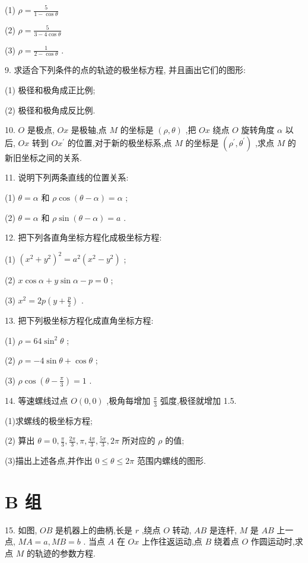 \documentclass[lang=cn,newtx,10pt,scheme=chinese]{elegantbook}
\begin{document}
(1) \(\rho = \frac{5}{1 - \cos \theta }\)

(2) \(\rho = \frac{5}{3 - 4\cos \theta }\)

(3) \(\rho = \frac{1}{2 - \cos \theta }\) .

9. 求适合下列条件的点的轨迹的极坐标方程, 并且画出它们的图形:

(1) 极径和极角成正比例;

(2) 极径和极角成反比例.

10. \(O\) 是极点, \({Ox}\) 是极轴,点 \(M\) 的坐标是 \(\left( {\rho ,\theta }\right)\) ,把 \({Ox}\) 绕点 \(O\) 旋转角度 \(\alpha\) 以后, \({Ox}\) 转到 \(O{x}^{\prime }\) 的位置,对于新的极坐标系,点 \(M\) 的坐标是 \(\left( {{\rho }^{\prime },{\theta }^{\prime }}\right)\) ,求点 \(M\) 的新旧坐标之间的关系.

11. 说明下列两条直线的位置关系:

(1) \(\theta = \alpha\) 和 \(\rho \cos \left( {\theta - \alpha }\right) = \alpha\) ;

(2) \(\theta = \alpha\) 和 \(\rho \sin \left( {\theta - \alpha }\right) = a\) .

12. 把下列各直角坐标方程化成极坐标方程:

(1) \({\left( {x}^{2} + {y}^{2}\right) }^{2} = {a}^{2}\left( {{x}^{2} - {y}^{2}}\right)\) ;

(2) \(x\cos \alpha + y\sin \alpha - p = 0\) ;

(3) \({x}^{2} = {2p}\left( {y + \frac{p}{2}}\right)\) .

13. 把下列极坐标方程化成直角坐标方程:

(1) \(\rho = {64}{\sin }^{2}\theta\) ;

(2) \(\rho = - 4\sin \theta + \cos \theta\) ;

(3) \(\rho \cos \left( {\theta - \frac{\pi }{3}}\right) = 1\) .

14. 等速螺线过点 \(O\left( {0,0}\right)\) ,极角每增加 \(\frac{\pi }{3}\) 弧度,极径就增加 1.5.

(1)求螺线的极坐标方程;

(2) 算出 \(\theta = 0,\frac{\pi }{3},\frac{2\pi }{3},\pi ,\frac{4\pi }{3},\frac{5\pi }{3},{2\pi }\) 所对应的 \(\rho\) 的值;

(3)描出上述各点,并作出 \(0 \leq \theta \leq {2\pi }\) 范围内螺线的图形.

\section*{B 组}

15. 如图, \({OB}\) 是机器上的曲柄,长是 \(r\) ,绕点 \(O\) 转动, \({AB}\) 是连杆, \(M\) 是 \({AB}\) 上一点, \({MA} = a,{MB} = b\) . 当点 \(A\) 在 \({Ox}\) 上作往返运动,点 \(B\) 绕着点 \(O\) 作圆运动时,求点 \(M\) 的轨迹的参数方程.
\end{document}
